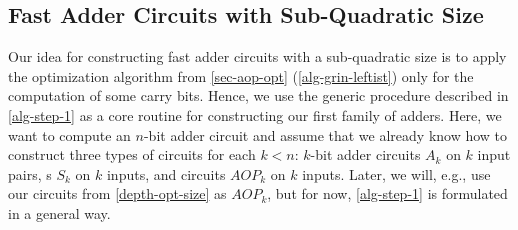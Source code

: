 
\subsection{Fast Adder Circuits with Sub-Quadratic Size} \label{sec: step 1}

Our idea for constructing fast adder circuits with a sub-quadratic size
is to apply the \aop{} optimization algorithm from \cref{sec-aop-opt}
(\cref{alg-grin-leftist})
only for the computation of some carry bits.
Hence, we use the generic procedure described in \cref{alg-step-1}
as a core routine for constructing our first family of adders.
Here, we want to compute an $n$-bit adder circuit
and assume that we already know how to construct
three types of circuits for each $k < n$:
$k$-bit adder circuits $A_k$ on $k$ input pairs,
\andprefixckt{}s $S\!_k$ on $k$ inputs,
and \aop{} circuits $AOP_k$ on $k$ inputs.
Later, we will, e.g., use our \aop{} circuits from \cref{depth-opt-size}
as $AOP_k$,
but for now, \cref{alg-step-1} is formulated in a general way.

